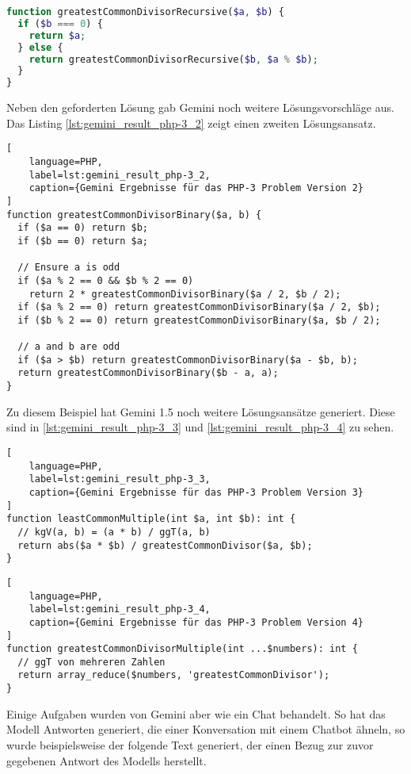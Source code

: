 \begin{lstlisting}[language=PHP,label=lst:gemini_result_php-3_1,caption={Gemini Ergebnis für das PHP-3 Problem Version 1}]
function greatestCommonDivisorRecursive($a, $b) {
  if ($b === 0) {
    return $a;
  } else {
    return greatestCommonDivisorRecursive($b, $a % $b);
  }
}
\end{lstlisting}

Neben den geforderten Lösung gab Gemini noch weitere Lösungsvorschläge aus. Das Listing \ref{lst:gemini_result_php-3_2} zeigt einen zweiten Lösungsansatz.\vspace{0.2cm}

\begin{lstlisting}[
	language=PHP,
	label=lst:gemini_result_php-3_2,
	caption={Gemini Ergebnisse für das PHP-3 Problem Version 2}
]
function greatestCommonDivisorBinary($a, b) {
  if ($a == 0) return $b;
  if ($b == 0) return $a;

  // Ensure a is odd
  if ($a % 2 == 0 && $b % 2 == 0)
    return 2 * greatestCommonDivisorBinary($a / 2, $b / 2);
  if ($a % 2 == 0) return greatestCommonDivisorBinary($a / 2, $b);
  if ($b % 2 == 0) return greatestCommonDivisorBinary($a, $b / 2);

  // a and b are odd
  if ($a > $b) return greatestCommonDivisorBinary($a - $b, b);
  return greatestCommonDivisorBinary($b - a, a);
}
\end{lstlisting}

Zu diesem Beispiel hat Gemini 1.5 noch weitere Lösungsansätze generiert. Diese sind in \ref{lst:gemini_result_php-3_3} und \ref{lst:gemini_result_php-3_4} zu sehen.

\begin{lstlisting}[
	language=PHP,
	label=lst:gemini_result_php-3_3,
	caption={Gemini Ergebnisse für das PHP-3 Problem Version 3}
]
function leastCommonMultiple(int $a, int $b): int {
  // kgV(a, b) = (a * b) / ggT(a, b)
  return abs($a * $b) / greatestCommonDivisor($a, $b);
}
\end{lstlisting}

\begin{lstlisting}[
	language=PHP,
	label=lst:gemini_result_php-3_4,
	caption={Gemini Ergebnisse für das PHP-3 Problem Version 4}
]
function greatestCommonDivisorMultiple(int ...$numbers): int {
  // ggT von mehreren Zahlen
  return array_reduce($numbers, 'greatestCommonDivisor');
}
\end{lstlisting}

Einige Aufgaben wurden von Gemini aber wie ein Chat behandelt. So hat das Modell Antworten generiert, die einer Konversation mit einem Chatbot ähneln, so wurde beispielsweise der folgende Text generiert, der einen Bezug zur zuvor gegebenen Antwort des Modells herstellt.

